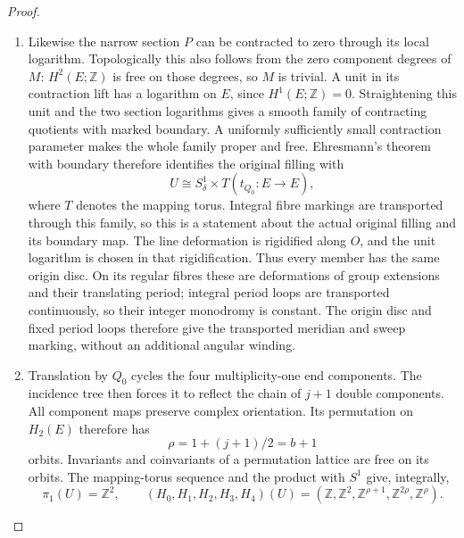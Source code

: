 \begin{proof}
\begin{enumerate}[label=\arabic*.,leftmargin=*]
\item Likewise the narrow section $P$ can be contracted to zero
through its local logarithm. Topologically this also follows
from the zero component degrees of $M$: $H^2(E;\mathbb Z)$
is free on those degrees, so $M$ is trivial. A unit in its
contraction lift has a logarithm on $E$, since $H^1(E;\mathbb Z)=0$.
Straightening this unit and the two section logarithms gives
a smooth family of contracting quotients with marked boundary.
A uniformly sufficiently small contraction parameter makes
the whole family proper and free. Ehresmann's theorem with
boundary therefore identifies the original filling with
\[
 U\cong S^1_\delta\times T(t_{Q_0}:E\to E),
 \tag{D.T4}\label{maps:eq:D.T4}
\]
where $T$ denotes the mapping torus. Integral fibre markings
are transported through this family, so this is a statement
about the actual original filling and its boundary map.
The line deformation is rigidified along $O$, and the unit
logarithm is chosen in that rigidification. Thus every member
has the same origin disc. On its regular fibres these are
deformations of group extensions and their translating period;
integral period loops are transported continuously, so their
integer monodromy is constant. The origin disc and fixed
period loops therefore give the transported meridian and sweep
marking, without an additional angular winding.

\item Translation by $Q_0$ cycles the four multiplicity-one end
components. The incidence tree then forces it to reflect the
chain of $j+1$ double components. All component maps preserve
complex orientation. Its permutation on $H_2(E)$ therefore
has
\[
                  \rho=1+(j+1)/2=b+1
\]
orbits. Invariants and coinvariants of a permutation lattice
are free on its orbits. The mapping-torus sequence and the
product with $S^1$ give, integrally,
\[
 \pi_1(U)=\mathbb Z^2,\qquad
 (H_0,H_1,H_2,H_3,H_4)(U)
  =(\mathbb Z,\mathbb Z^2,\mathbb Z^{\rho+1},
                         \mathbb Z^{2\rho},\mathbb Z^\rho).
 \tag{D.T5}\label{maps:eq:D.T5}
\]


\end{enumerate}
\end{proof}
